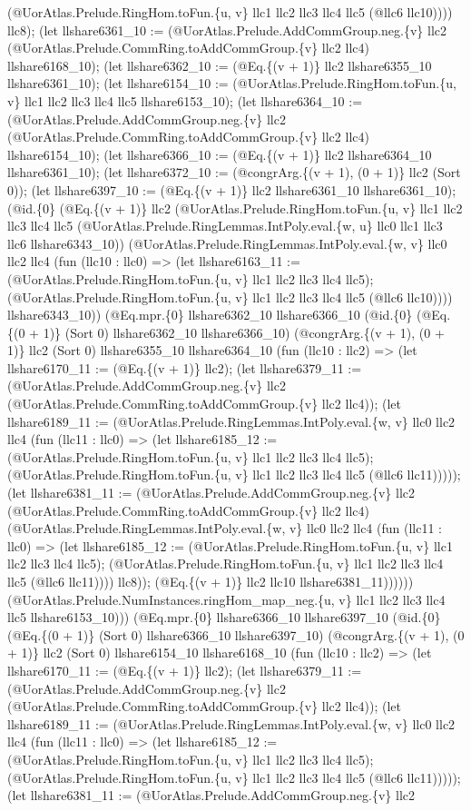 \documentclass[11pt]{article}
\begin{document}
(@UorAtlas.Prelude.RingHom.toFun.\{u, v\} llc1 llc2 llc3 llc4 llc5 (@llc6 llc10)))) llc8); (let llshare6361\_10 := (@UorAtlas.Prelude.AddCommGroup.neg.\{v\} llc2 (@UorAtlas.Prelude.CommRing.toAddCommGroup.\{v\} llc2 llc4) llshare6168\_10); (let llshare6362\_10 := (@Eq.\{(v + 1)\} llc2 llshare6355\_10 llshare6361\_10); (let llshare6154\_10 := (@UorAtlas.Prelude.RingHom.toFun.\{u, v\} llc1 llc2 llc3 llc4 llc5 llshare6153\_10); (let llshare6364\_10 := (@UorAtlas.Prelude.AddCommGroup.neg.\{v\} llc2 (@UorAtlas.Prelude.CommRing.toAddCommGroup.\{v\} llc2 llc4) llshare6154\_10); (let llshare6366\_10 := (@Eq.\{(v + 1)\} llc2 llshare6364\_10 llshare6361\_10); (let llshare6372\_10 := (@congrArg.\{(v + 1), (0 + 1)\} llc2 (Sort 0)); (let llshare6397\_10 := (@Eq.\{(v + 1)\} llc2 llshare6361\_10 llshare6361\_10); (@id.\{0\} (@Eq.\{(v + 1)\} llc2 (@UorAtlas.Prelude.RingHom.toFun.\{u, v\} llc1 llc2 llc3 llc4 llc5 (@UorAtlas.Prelude.RingLemmas.IntPoly.eval.\{w, u\} llc0 llc1 llc3 llc6 llshare6343\_10)) (@UorAtlas.Prelude.RingLemmas.IntPoly.eval.\{w, v\} llc0 llc2 llc4 (fun (llc10 : llc0) => (let llshare6163\_11 := (@UorAtlas.Prelude.RingHom.toFun.\{u, v\} llc1 llc2 llc3 llc4 llc5); (@UorAtlas.Prelude.RingHom.toFun.\{u, v\} llc1 llc2 llc3 llc4 llc5 (@llc6 llc10)))) llshare6343\_10)) (@Eq.mpr.\{0\} llshare6362\_10 llshare6366\_10 (@id.\{0\} (@Eq.\{(0 + 1)\} (Sort 0) llshare6362\_10 llshare6366\_10) (@congrArg.\{(v + 1), (0 + 1)\} llc2 (Sort 0) llshare6355\_10 llshare6364\_10 (fun (llc10 : llc2) => (let llshare6170\_11 := (@Eq.\{(v + 1)\} llc2); (let llshare6379\_11 := (@UorAtlas.Prelude.AddCommGroup.neg.\{v\} llc2 (@UorAtlas.Prelude.CommRing.toAddCommGroup.\{v\} llc2 llc4)); (let llshare6189\_11 := (@UorAtlas.Prelude.RingLemmas.IntPoly.eval.\{w, v\} llc0 llc2 llc4 (fun (llc11 : llc0) => (let llshare6185\_12 := (@UorAtlas.Prelude.RingHom.toFun.\{u, v\} llc1 llc2 llc3 llc4 llc5); (@UorAtlas.Prelude.RingHom.toFun.\{u, v\} llc1 llc2 llc3 llc4 llc5 (@llc6 llc11))))); (let llshare6381\_11 := (@UorAtlas.Prelude.AddCommGroup.neg.\{v\} llc2 (@UorAtlas.Prelude.CommRing.toAddCommGroup.\{v\} llc2 llc4) (@UorAtlas.Prelude.RingLemmas.IntPoly.eval.\{w, v\} llc0 llc2 llc4 (fun (llc11 : llc0) => (let llshare6185\_12 := (@UorAtlas.Prelude.RingHom.toFun.\{u, v\} llc1 llc2 llc3 llc4 llc5); (@UorAtlas.Prelude.RingHom.toFun.\{u, v\} llc1 llc2 llc3 llc4 llc5 (@llc6 llc11)))) llc8)); (@Eq.\{(v + 1)\} llc2 llc10 llshare6381\_11)))))) (@UorAtlas.Prelude.NumInstances.ringHom\_map\_neg.\{u, v\} llc1 llc2 llc3 llc4 llc5 llshare6153\_10))) (@Eq.mpr.\{0\} llshare6366\_10 llshare6397\_10 (@id.\{0\} (@Eq.\{(0 + 1)\} (Sort 0) llshare6366\_10 llshare6397\_10) (@congrArg.\{(v + 1), (0 + 1)\} llc2 (Sort 0) llshare6154\_10 llshare6168\_10 (fun (llc10 : llc2) => (let llshare6170\_11 := (@Eq.\{(v + 1)\} llc2); (let llshare6379\_11 := (@UorAtlas.Prelude.AddCommGroup.neg.\{v\} llc2 (@UorAtlas.Prelude.CommRing.toAddCommGroup.\{v\} llc2 llc4)); (let llshare6189\_11 := (@UorAtlas.Prelude.RingLemmas.IntPoly.eval.\{w, v\} llc0 llc2 llc4 (fun (llc11 : llc0) => (let llshare6185\_12 := (@UorAtlas.Prelude.RingHom.toFun.\{u, v\} llc1 llc2 llc3 llc4 llc5); (@UorAtlas.Prelude.RingHom.toFun.\{u, v\} llc1 llc2 llc3 llc4 llc5 (@llc6 llc11))))); (let llshare6381\_11 := (@UorAtlas.Prelude.AddCommGroup.neg.\{v\} llc2 
\end{document}
